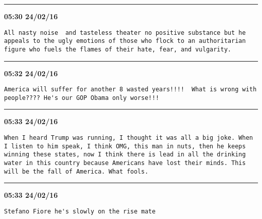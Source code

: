\hrule%

\begin{adjustwidth}{0cm}{0cm}
\footnotesize \textbf{05:30 24/02/16}

\begin{lstlisting}[breaklines, breakatwhitespace, basicstyle=\small, frame=leftline]
All nasty noise  and tasteless theater no positive substance but he appeals to the ugly emotions of those who flock to an authoritarian  figure who fuels the flames of their hate, fear, and vulgarity.
\end{lstlisting}
\end{adjustwidth}

\hrule%

\begin{adjustwidth}{0cm}{0cm}
\footnotesize \textbf{05:32 24/02/16}

\begin{lstlisting}[breaklines, breakatwhitespace, basicstyle=\small, frame=leftline]
America will suffer for another 8 wasted years!!!!  What is wrong with people???? He's our GOP Obama only worse!!!
\end{lstlisting}
\end{adjustwidth}

\hrule%

\begin{adjustwidth}{0cm}{0cm}
\footnotesize \textbf{05:33 24/02/16}

\begin{lstlisting}[breaklines, breakatwhitespace, basicstyle=\small, frame=leftline]
When I heard Trump was running, I thought it was all a big joke. When I listen to him speak, I think OMG, this man in nuts, then he keeps winning these states, now I think there is lead in all the drinking water in this country because Americans have lost their minds. This will be the fall of America. What fools.
\end{lstlisting}
\end{adjustwidth}

\hrule%

\begin{adjustwidth}{0cm}{0cm}
\footnotesize \textbf{05:33 24/02/16}

\begin{lstlisting}[breaklines, breakatwhitespace, basicstyle=\small, frame=leftline]
Stefano Fiore he's slowly on the rise mate
\end{lstlisting}
\end{adjustwidth}


